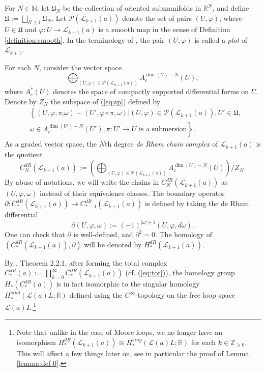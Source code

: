 \documentclass[a4paper]{article}
\numberwithin{equation}{section}
\begin{document}
For $N\in\mathbb{N}$, let $\mathfrak{U}_N$ be the collection of oriented submanifolds in $\mathbb{R}^N$, and define $\mathfrak{U}:=\bigsqcup_{N\geq1}\mathfrak{U}_N$. Let $\mathcal{P}(\mathcal{L}_{k+1}(a))$ denote the set of pairs $(U,\varphi)$, where $U\in\mathfrak{U}$ and $\varphi:U\rightarrow\mathcal{L}_{k+1}(a)$ is a smooth map in the sense of Definition \ref{definition:smooth}. In the terminology of \cite{ki1}, the pair $(U,\varphi)$ is called a \textit{plot} of $\mathcal{L}_{k+1}$.

For each $N$, consider the vector space
\begin{equation}\label{eq:sp}
\bigoplus_{(U,\varphi)\in\mathcal{P}(\mathcal{L}_{k+1}(a))}A_c^{\dim(U)-N}(U),
\end{equation}
where $A_c^\ast(U)$ denotes the space of compactly supported differential forms on $U$. Denote by $Z_N$ the subspace of (\ref{eq:sp}) defined by
\begin{equation}
	\begin{split}
	&\left\{(U,\varphi,\pi_!\omega)-(U',\varphi\circ\pi,\omega)|(U,\varphi)\in\mathcal{P}(\mathcal{L}_{k+1}(a)),U'\in\mathfrak{U}, \right. \\
	&\left.\omega\in A_c^{\dim(U')-N}(U'),\pi:U'\rightarrow U\textrm{ is a submersion}\right\}.
	\end{split}
\end{equation}
As a graded vector space, the $N$th degree \textit{de Rham chain complex} of $\mathcal{L}_{k+1}(a)$ is the quotient
\begin{equation}
C_N^\mathit{dR}(\mathcal{L}_{k+1}(a)):=\left(\bigoplus_{(U,\varphi)\in\mathcal{P}(\mathcal{L}_{k+1}(a))}A_c^{\dim(U)-N}(U)\right)/Z_N.
\end{equation}
By abuse of notations, we will write the chains in $C_N^\mathit{dR}(\mathcal{L}_{k+1}(a))$ as $(U,\varphi,\omega)$ instead of their equivalence classes. The boundary operator $\partial:C_\ast^\mathit{dR}(\mathcal{L}_{k+1}(a))\rightarrow C_{\ast-1}^\mathit{dR}(\mathcal{L}_{k+1}(a))$ is defined by taking the de Rham differential
\begin{equation}
\partial(U,\varphi,\omega):=(-1)^{|\omega|+1}(U,\varphi,d\omega).
\end{equation}
One can check that $\partial$ is well-defined, and $\partial^2=0$. The homology of $\left(C_\ast^\mathit{dR}(\mathcal{L}_{k+1}(a)),\partial\right)$ will be denoted by $H_\ast^\mathit{dR}(\mathcal{L}_{k+1}(a))$.

By \cite{ywt}, Theorem 2.2.1, after forming the total complex $C_\ast^\mathit{dR}(a):=\prod_{k=0}^\infty C_\ast^\mathit{dR}(\mathcal{L}_{k+1}(a))$ (cf. (\ref{eq:tot})), the homology group $H_\ast\left(C_\ast^\mathit{dR}(a)\right)$ is in fact isomorphic to the singular homology $H_\ast^\mathit{sing}(\mathcal{L}(a)L;\mathbb{R})$ defined using the $C^\infty$-topology on the free loop space $\mathcal{L}(a)L$.\footnote{Note that unlike in the case of Moore loops, we no longer have an isomorphism $H_\ast^\mathit{dR}(\mathcal{L}_{k+1}(a))\cong H_\ast^\mathit{sing}(\mathcal{L}(a)L;\mathbb{R})$ for each $k\in\mathbb{Z}_{\geq0}$. This will affect a few things later on, see in particular the proof of Lemma \ref{lemma:def-0}.}
\end{document}
